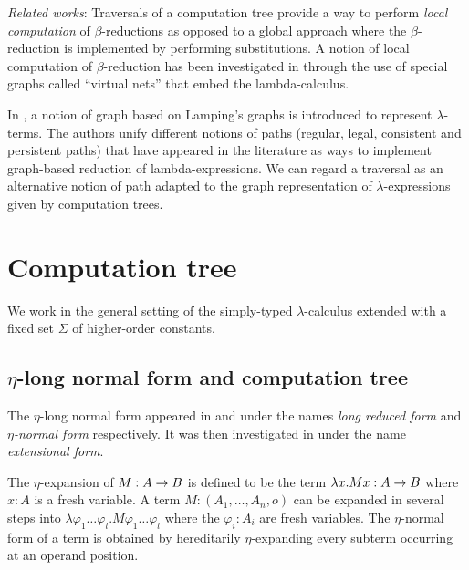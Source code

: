 \emph{Related works}: Traversals of a computation tree provide a way
to perform \emph{local computation} of $\beta$-reductions as opposed
to a global approach where the $\beta$-reduction is implemented by
performing substitutions. A notion of local computation of
$\beta$-reduction has been investigated in
\cite{DanosRegnier-Localandasynchronou} through the use of special
graphs called ``virtual nets'' that embed the lambda-calculus.

In \cite{DBLP:conf/lics/AspertiDLR94}, a notion of graph based on
Lamping's graphs \citep{lamping} is introduced to represent
$\lambda$-terms. The authors unify different notions of paths
(regular, legal, consistent and persistent paths) that have appeared
in the literature as ways to implement graph-based reduction of
lambda-expressions. We can regard a traversal as an alternative
notion of path adapted to the graph representation of
$\lambda$-expressions given by computation trees.



%

\section{Computation tree}
We work in the general setting of the simply-typed
$\lambda$-calculus extended with a fixed set $\Sigma$ of
higher-order constants.

\subsection{$\eta$-long normal form and computation tree}

The $\eta$-long normal form appeared in
\citep{DBLP:journals/tcs/JensenP76} and
\citep{DBLP:journals/tcs/Huet75} under the names \emph{long reduced
form} and \emph{$\eta$-normal form} respectively. It was then
investigated in \citep{huet76} under the name \emph{extensional
form}.

The $\eta$-expansion of $M: A\rightarrow B$ is defined to be the term
$\lambda x . M x : A\rightarrow B$ where $x:A$ is a fresh variable. A
term $M : (A_1,\ldots,A_n,o)$ can be expanded in several steps into
$\lambda \varphi_1 \ldots \varphi_l . M \varphi_1 \ldots \varphi_l$
where the $\varphi_i:A_i$ are fresh variables. The $\eta$-normal
form of a term is obtained by hereditarily $\eta$-expanding every
subterm occurring at an operand position.

